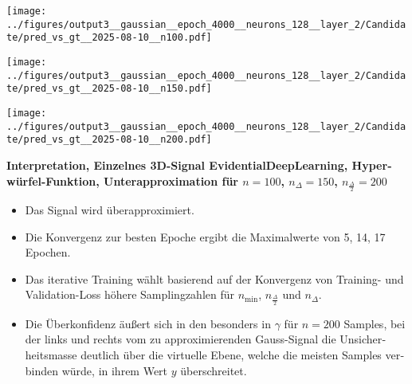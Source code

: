 \begin{otherlanguage}{ngerman}
\begin{samepage}
\begin{minipage}{\textwidth}
\vspace{0.125cm}

\begin{minipage}{0.05\textwidth}
    \centering{}
\end{minipage}%
\begin{minipage}{0.3\textwidth}
    \centering
    \texttt{[image: ../figures/output3\_\_gaussian\_\_epoch\_4000\_\_neurons\_128\_\_layer\_2/Candidate/pred\_vs\_gt\_\_2025-08-10\_\_n100.pdf]}
\end{minipage}%
\begin{minipage}{0.3\textwidth}
    \centering
    \texttt{[image: ../figures/output3\_\_gaussian\_\_epoch\_4000\_\_neurons\_128\_\_layer\_2/Candidate/pred\_vs\_gt\_\_2025-08-10\_\_n150.pdf]}
\end{minipage}%
\begin{minipage}{0.3\textwidth}
    \centering
    \texttt{[image: ../figures/output3\_\_gaussian\_\_epoch\_4000\_\_neurons\_128\_\_layer\_2/Candidate/pred\_vs\_gt\_\_2025-08-10\_\_n200.pdf]}
\end{minipage}

\label{fig:pred_vs_gt_matrix}

\end{minipage}
\end{samepage}



\clearpage

\begin{samepage}
\begin{minipage}{\textwidth}

\noindent\textbf{Interpretation, Einzelnes 3D-Signal \gls{EvidentialDeepLearning}, Hyperwürfel-Funktion,
Unterapproximation für $n=100$, $n_{\Delta}=150$, $n_{\frac{\Delta}{2}}=200$}

\begin{itemize}
    \item Das Signal wird überapproximiert.
    \item Die Konvergenz zur besten Epoche ergibt die Maximalwerte von 5, 14, 17 Epochen.
    \item Das iterative Training wählt basierend auf der Konvergenz von Training- und Validation-Loss höhere Samplingzahlen für $n_{\min}$, $n_{\frac{\Delta}{2}}$ und $n_{\Delta}$.
    \item Die Überkonfidenz äußert sich in den besonders in $\gamma$ für $n=200$ Samples, bei der links und rechts vom zu approximierenden Gauss-Signal die Unsicherheitsmasse deutlich über die virtuelle Ebene, welche die meisten Samples verbinden würde, in ihrem Wert $y$ überschreitet.
\end{itemize}





\end{minipage}
\end{samepage}
\end{otherlanguage}
